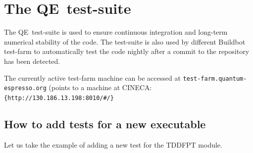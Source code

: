 \documentclass[12pt,a4paper]{article}
\def\qe{QE}
\begin{document}
\section{The \qe \, test-suite}
\label{Sec:testfarm}

The \qe\, test-suite is used to ensure continuous integration and long-term numerical stability of the code.
The test-suite is also used by different Buildbot test-farm to automatically test the code nightly after a commit to the repository has been detected. 

The currently active test-farm machine can be accessed at 
\texttt{test-farm.quantum-espresso.org} (points to a machine at CINECA:
\verb|{http://130.186.13.198:8010/#/}|

\subsection{How to add tests for a new executable}

Let us take the example of adding a new test for the TDDFPT module. 
\end{document}

